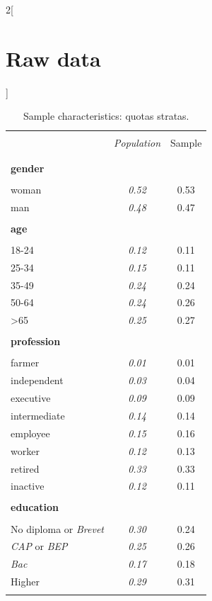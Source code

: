 \documentclass[11pt]{article}
\renewcommand{\arraystretch}{0.73}
\begin{document}
\newpage



\newpage
\begin{appendices}


\begin{multicols}{2}[\section{Raw data\label{sec:Raw-Data}}]

\renewcommand{\arraystretch}{0.58}

\begin{table}[H]
\label{table:sample_characteristics}
\caption{\label{tab:Sample-Characteristics}Sample characteristics: quotas stratas.}
\centering
\begin{tabular}{lcc}
\hline \hline  \\[-1.8ex]
 & \emph{Population} & Sample  \tabularnewline \\[-1.8ex]
\hline  \\[-1.8ex]
\textbf{gender} & & \tabularnewline  \\[-1.8ex]
woman & \emph{0.52} & 0.53\tabularnewline
man & \emph{0.48} & 0.47\tabularnewline
\hline \\[-1.8ex]
\textbf{age} &  & \tabularnewline  \\[-1.8ex]
18-24 & \emph{0.12} & 0.11\tabularnewline
25-34 & \emph{0.15} & 0.11\tabularnewline
35-49 & \emph{0.24} & 0.24\tabularnewline
50-64 & \emph{0.24} & 0.26\tabularnewline
>65 & \emph{0.25} & 0.27\tabularnewline
\hline \\[-1.8ex]
\textbf{profession} &  & \tabularnewline  \\[-1.8ex]
farmer & \emph{0.01} & 0.01\tabularnewline
independent & \emph{0.03} & 0.04\tabularnewline
executive & \emph{0.09} & 0.09\tabularnewline
intermediate & \emph{0.14} & 0.14\tabularnewline
employee & \emph{0.15} & 0.16\tabularnewline
worker & \emph{0.12} & 0.13\tabularnewline
retired & \emph{0.33} & 0.33\tabularnewline
inactive & \emph{0.12} & 0.11\tabularnewline
\hline  \\[-1.8ex]
\textbf{education} &  & \tabularnewline  \\[-1.8ex]
No diploma or \emph{Brevet} & \emph{0.30} & 0.24\tabularnewline
\emph{CAP} or \emph{BEP} & \emph{0.25} & 0.26\tabularnewline
\emph{Bac} & \emph{0.17} & 0.18\tabularnewline
Higher & \emph{0.29} & 0.31\tabularnewline
\hline  \\[-1.8ex]

\end{tabular}
\end{table}
\end{multicols}
\end{appendices}
\end{document}
